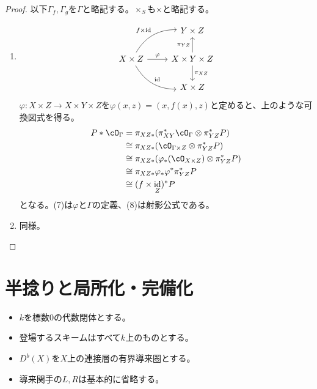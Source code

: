 \documentclass[uplatex, a4paper, dvipdfmx]{jsarticle}
\theoremstyle{definition}
\DeclareMathOperator{\id}{\mathrm{id}}
\begin{document}
\begin{proof}
    以下$\Gamma_f, \Gamma_g$を$\Gamma$と略記する。$\times_S$も$\times$と略記する。
    \begin{enumerate}
        \item \[
                  \begin{tikzcd}
                      & Y \times Z\\
                      X \times Z \ar[r, "\varphi"] \ar[rd, bend right, "\id"] \ar[ru, "f \times \id", bend left]& X \times Y \times Z \ar[d, "\pi_{XZ}"] \ar[u, "\pi_{YZ}"]\\
                      &X \times Z
                  \end{tikzcd}
              \]
              $\varphi \colon X \times Z \to X \times Y \times Z$を$\varphi(x, z) = (x, f(x), z)$と定めると、上のような可換図式を得る。
              \begin{align}
                  P * \cO_\Gamma & = \pi_{XZ*}(\pi_{XY}^*\cO_{\Gamma} \otimes \pi_{YZ}^*P)        \\
                                 & \cong \pi_{XZ*}(\cO_{\Gamma \times Z}\otimes\pi_{YZ}^*P)       \\
                                 & \cong \pi_{XZ*}(\varphi_*(\cO_{X \times Z})\otimes\pi_{YZ}^*P) \\
                                 & \cong \pi_{XZ*}\varphi_*\varphi^*\pi_{YZ}^*P                   \\
                                 & \cong (f \times \id_Z)^*P
              \end{align}
              となる。(7)は$\varphi$と$\Gamma$の定義、(8)は射影公式である。
        \item 同様。
    \end{enumerate}
\end{proof}

\section{半捻りと局所化・完備化}
\begin{itemize}
    \item $k$を標数$0$の代数閉体とする。
    \item 登場するスキームはすべて$k$上のものとする。
    \item $D^b(X)$を$X$上の連接層の有界導来圏とする。
    \item 導来関手の$L, R$は基本的に省略する。
\end{itemize}
\end{document}
